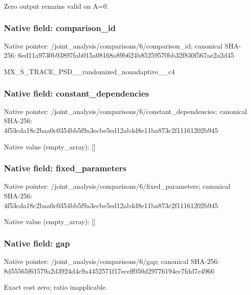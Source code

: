 \documentclass[10pt,a4paper]{article}
\begin{document}
\begingroup\raggedright\sloppy Zero output remains valid on A=\allowbreak{}0.\par\endgroup

\subsubsection{Native field: comparison\_\allowbreak{}id}
Native pointer: /joint\_\allowbreak{}analysis/comparisons/6/comparison\_\allowbreak{}id; canonical SHA-256: 6ed11a9730b93897fab015a08168a89b624b85259570bb32f830f567ae2a2d45

\begingroup\raggedright\sloppy MX\_\allowbreak{}S\_\allowbreak{}TRACE\_\allowbreak{}PSD\_\allowbreak{}\_\allowbreak{}randomized\_\allowbreak{}nonadaptive\_\allowbreak{}\_\allowbreak{}c4\par\endgroup

\subsubsection{Native field: constant\_\allowbreak{}dependencies}
Native pointer: /joint\_\allowbreak{}analysis/comparisons/6/constant\_\allowbreak{}dependencies; canonical SHA-256: 4f53cda18c2baa0c0354bb5f9a3ecbe5ed12ab4d8e11ba873c2f11161202b945

Native value (empty\_\allowbreak{}array): []

\subsubsection{Native field: fixed\_\allowbreak{}parameters}
Native pointer: /joint\_\allowbreak{}analysis/comparisons/6/fixed\_\allowbreak{}parameters; canonical SHA-256: 4f53cda18c2baa0c0354bb5f9a3ecbe5ed12ab4d8e11ba873c2f11161202b945

Native value (empty\_\allowbreak{}array): []

\subsubsection{Native field: gap}
Native pointer: /joint\_\allowbreak{}analysis/comparisons/6/gap; canonical SHA-256: 8d55565f61579a2d3924d4c9a4452571f17eceff050d29776194ec7fdd7e4966

\begingroup\raggedright\sloppy Exact cost zero;\allowbreak{} ratio inapplicable.\par\endgroup
\end{document}
